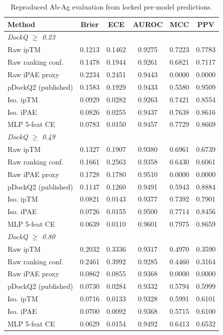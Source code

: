 \begin{table}[t]
\centering
\caption{Reproduced Ab-Ag evaluation from locked per-model predictions.}
\label{tab:abag_reproduced}
\begin{tabular}{lccccc}
\toprule
Method & Brier & ECE & AUROC & MCC & PPV \\
\midrule
\multicolumn{6}{l}{\textit{DockQ $\geq$ 0.23}} \\
Raw ipTM & 0.1213 & 0.1462 & 0.9275 & 0.7223 & 0.7783 \\
Raw ranking conf. & 0.1478 & 0.1944 & 0.9261 & 0.6821 & 0.7117 \\
Raw iPAE proxy & 0.2234 & 0.2451 & 0.9443 & 0.0000 & 0.0000 \\
pDockQ2 (published) & 0.1583 & 0.1929 & 0.9433 & 0.5580 & 0.9509 \\
Iso. ipTM & 0.0929 & 0.0282 & 0.9263 & 0.7421 & 0.8554 \\
Iso. iPAE & 0.0826 & 0.0255 & 0.9437 & 0.7638 & 0.8616 \\
MLP 5-feat CE & 0.0783 & 0.0150 & 0.9457 & 0.7729 & 0.8669 \\
\midrule
\multicolumn{6}{l}{\textit{DockQ $\geq$ 0.49}} \\
Raw ipTM & 0.1327 & 0.1907 & 0.9380 & 0.6961 & 0.6739 \\
Raw ranking conf. & 0.1661 & 0.2563 & 0.9358 & 0.6430 & 0.6061 \\
Raw iPAE proxy & 0.1728 & 0.1780 & 0.9510 & 0.0000 & 0.0000 \\
pDockQ2 (published) & 0.1147 & 0.1260 & 0.9491 & 0.5943 & 0.8884 \\
Iso. ipTM & 0.0821 & 0.0143 & 0.9377 & 0.7392 & 0.7901 \\
Iso. iPAE & 0.0726 & 0.0155 & 0.9500 & 0.7714 & 0.8456 \\
MLP 5-feat CE & 0.0639 & 0.0110 & 0.9601 & 0.7975 & 0.8659 \\
\midrule
\multicolumn{6}{l}{\textit{DockQ $\geq$ 0.80}} \\
Raw ipTM & 0.2032 & 0.3336 & 0.9317 & 0.4970 & 0.3590 \\
Raw ranking conf. & 0.2461 & 0.3992 & 0.9285 & 0.4460 & 0.3164 \\
Raw iPAE proxy & 0.0862 & 0.0855 & 0.9368 & 0.0000 & 0.0000 \\
pDockQ2 (published) & 0.0730 & 0.0284 & 0.9332 & 0.5794 & 0.5999 \\
Iso. ipTM & 0.0716 & 0.0133 & 0.9328 & 0.5991 & 0.6101 \\
Iso. iPAE & 0.0700 & 0.0092 & 0.9368 & 0.5715 & 0.6100 \\
MLP 5-feat CE & 0.0629 & 0.0154 & 0.9492 & 0.6413 & 0.6532 \\
\bottomrule
\end{tabular}
\end{table}
